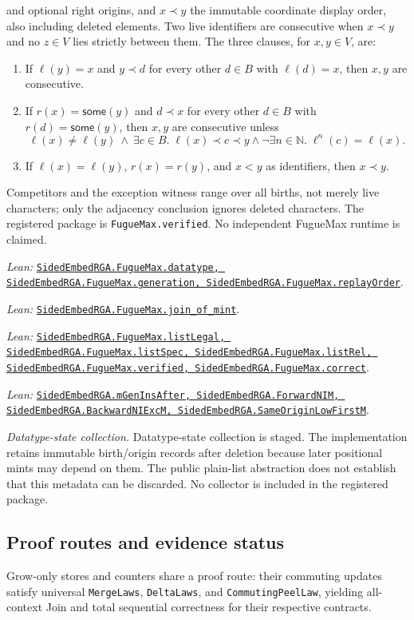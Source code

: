 \documentclass[11pt]{article}
\theoremstyle{definition}
\newcommand{\N}{\mathbb N}
\newcommand{\lean}[1]{\texttt{#1}}
\newcommand{\src}[2]{\href{../../#1}{\texttt{#2}}}
\newcommand{\anchor}[2]{\par\smallskip\noindent\emph{Lean: }\src{#1}{#2}.}
\begin{document}
and optional right origins, and $x\prec y$ the immutable coordinate display
order, also including deleted elements. Two live identifiers are consecutive
when $x\prec y$ and no $z\in V$ lies strictly between them. The three clauses,
for $x,y\in V$, are:
\begin{enumerate}
 \item If $\ell(y)=x$ and $y\prec d$ for every other $d\in B$ with
 $\ell(d)=x$, then $x,y$ are consecutive.
 \item If $r(x)=\mathsf{some}(y)$ and $d\prec x$ for every other $d\in B$
 with $r(d)=\mathsf{some}(y)$, then $x,y$ are consecutive unless
 \[
  \ell(x)\ne\ell(y)\ \land\
  \exists c\in B.\;\ell(x)\prec c\prec y
    \land\neg\exists n\in\N.\;\ell^n(c)=\ell(x).
 \]
 \item If $\ell(x)=\ell(y)$, $r(x)=r(y)$, and $x<y$ as identifiers,
 then $x\prec y$.
\end{enumerate}
Competitors and the exception witness range over all births, not merely live
characters; only the adjacency conclusion ignores deleted characters.
The registered package is \lean{FugueMax.verified}.
No independent FugueMax runtime is claimed.
\anchor{Sal/MRDTs/Instances/FugueMaxImplementation.lean}
  {SidedEmbedRGA.FugueMax.datatype, SidedEmbedRGA.FugueMax.generation,
   SidedEmbedRGA.FugueMax.replayOrder}
\anchor{Sal/MRDTs/Instances/FugueMaxReplayProof.lean}
  {SidedEmbedRGA.FugueMax.join\_of\_mint}
\anchor{Sal/MRDTs/Instances/FugueMaxContract.lean}
  {SidedEmbedRGA.FugueMax.listLegal, SidedEmbedRGA.FugueMax.listSpec, SidedEmbedRGA.FugueMax.listRel,
   SidedEmbedRGA.FugueMax.verified, SidedEmbedRGA.FugueMax.correct}
\anchor{Sal/MRDTs/Instances/FugueMax.lean}
  {SidedEmbedRGA.mGenInsAfter, SidedEmbedRGA.ForwardNIM,
   SidedEmbedRGA.BackwardNIExcM, SidedEmbedRGA.SameOriginLowFirstM}

\emph{Datatype-state collection.} Datatype-state collection is staged. The implementation retains immutable
birth/origin records after deletion because later positional mints may depend
on them. The public plain-list abstraction does not establish that this
metadata can be discarded. No collector is included in the registered package.

\subsection{Proof routes and evidence status}

Grow-only stores and counters share a proof route: their commuting updates
satisfy universal \lean{MergeLaws}, \lean{DeltaLaws}, and
\lean{CommutingPeelLaw}, yielding all-context Join and total sequential
correctness for their respective contracts.
\end{document}
